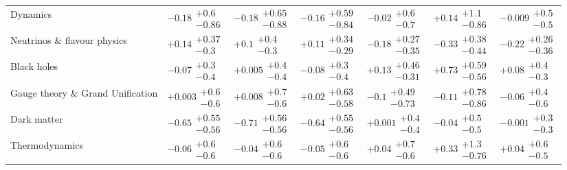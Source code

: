 \begin{table}[H]
\begin{tabular}{lllllll}
Dynamics & $-0.18\substack{+0.6 \\ -0.86}$ & $-0.18\substack{+0.65 \\ -0.88}$ & $-0.16\substack{+0.59 \\ -0.84}$ & $-0.02\substack{+0.6 \\ -0.7}$ & $+0.14\substack{+1.1 \\ -0.86}$ & $-0.009\substack{+0.5 \\ -0.5}$ \\
Neutrinos \& flavour physics & $+0.14\substack{+0.37 \\ -0.3}$ & $+0.1\substack{+0.4 \\ -0.3}$ & $+0.11\substack{+0.34 \\ -0.29}$ & $-0.18\substack{+0.27 \\ -0.35}$ & $-0.33\substack{+0.38 \\ -0.44}$ & $-0.22\substack{+0.26 \\ -0.36}$ \\
Black holes & $-0.07\substack{+0.3 \\ -0.4}$ & $+0.005\substack{+0.4 \\ -0.4}$ & $-0.08\substack{+0.3 \\ -0.4}$ & $+0.13\substack{+0.46 \\ -0.31}$ & $\bm{+0.73}\substack{+0.59 \\ -0.56}$ & $+0.08\substack{+0.4 \\ -0.3}$ \\
Gauge theory \& Grand Unification & $+0.003\substack{+0.6 \\ -0.6}$ & $+0.008\substack{+0.7 \\ -0.6}$ & $+0.02\substack{+0.63 \\ -0.58}$ & $-0.1\substack{+0.49 \\ -0.73}$ & $-0.11\substack{+0.78 \\ -0.86}$ & $-0.06\substack{+0.4 \\ -0.6}$ \\
Dark matter & $\bm{-0.65}\substack{+0.55 \\ -0.56}$ & $\bm{-0.71}\substack{+0.56 \\ -0.56}$ & $\bm{-0.64}\substack{+0.55 \\ -0.56}$ & $+0.001\substack{+0.4 \\ -0.4}$ & $-0.04\substack{+0.5 \\ -0.5}$ & $-0.001\substack{+0.3 \\ -0.3}$ \\
Thermodynamics & $-0.06\substack{+0.6 \\ -0.6}$ & $-0.04\substack{+0.6 \\ -0.6}$ & $-0.05\substack{+0.6 \\ -0.6}$ & $+0.04\substack{+0.7 \\ -0.6}$ & $+0.33\substack{+1.3 \\ -0.76}$ & $+0.04\substack{+0.6 \\ -0.5}$ \\

\end{tabular}
\end{table}

